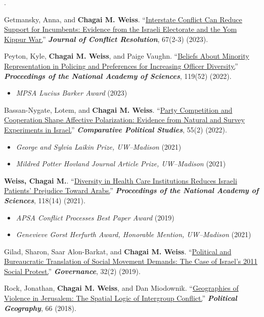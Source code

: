 \documentclass[11pt]{article}
\newcounter{cvpub}
\newenvironment{cvpubs}[1]
  {\setcounter{cvpub}{#1}\addtocounter{cvpub}{1}%
   \RaggedRight\interlinepenalty=150%
   \begin{list}{\addtocounter{cvpub}{-1}\arabic{cvpub}.}%
     {\setlength{\labelwidth}{1.85em}%
      \setlength{\labelsep}{0.45em}%
      \setlength{\leftmargin}{2.30em}%
      \setlength{\rightmargin}{0pt}%
      \setlength{\itemindent}{0pt}%
      \setlength{\listparindent}{0pt}%
      \setlength{\topsep}{0pt}%
      \setlength{\partopsep}{0pt}%
      \setlength{\parsep}{0pt}%
      \setlength{\itemsep}{5.5pt}%
      \renewcommand{\makelabel}[1]{\hfil##1}}}
  {\end{list}}
\newenvironment{cvnotes}[1][$\star$]
  {\begin{itemize}[#1,leftmargin=2.4em,labelsep=0.4em,
                   topsep=1.5pt,itemsep=0.5pt,parsep=0pt,partopsep=0pt]}
  {\end{itemize}}
\begin{document}
\begin{cvpubs}{18}
\item Getmansky, Anna, and \textbf{Chagai M. Weiss}. ``\href{https://journals.sagepub.com/doi/10.1177/00220027221114086}{Interstate Conflict Can Reduce Support for Incumbents: Evidence from the Israeli Electorate and the Yom Kippur War.}'' \textbf{\emph{Journal of Conflict Resolution}}, 67(2-3) (2023).
\item Peyton, Kyle, \textbf{Chagai M. Weiss}, and Paige Vaughn. ``\href{https://www.pnas.org/doi/10.1073/pnas.2213986119}{Beliefs About Minority Representation in Policing and Preferences for Increasing Officer Diversity.}'' \textbf{\emph{Proceedings of the National Academy of Sciences}}, 119(52) (2022).
\begin{cvnotes}
    \item \emph{MPSA Lucius Barker Award} (2023)
\end{cvnotes}
\item Bassan-Nygate, Lotem, and \textbf{Chagai M. Weiss}. ``\href{https://journals.sagepub.com/doi/full/10.1177/00104140211024283}{Party Competition and Cooperation Shape Affective Polarization: Evidence from Natural and Survey Experiments in Israel.}'' \textbf{\emph{Comparative Political Studies}}, 55(2) (2022).
\begin{cvnotes}
    \item \emph{George and Sylvia Laikin Prize, UW--Madison} (2021)
    \item \emph{Mildred Potter Hovland Journal Article Prize, UW--Madison} (2021)
\end{cvnotes}
\item \textbf{Weiss, Chagai M.}. ``\href{https://www.pnas.org/content/118/14/e2022634118}{Diversity in Health Care Institutions Reduces Israeli Patients' Prejudice Toward Arabs.}'' \textbf{\emph{Proceedings of the National Academy of Sciences}}, 118(14) (2021).
\begin{cvnotes}
    \item \emph{APSA Conflict Processes Best Paper Award} (2019)
    \item \emph{Genevieve Gorst Herfurth Award, Honorable Mention, UW--Madison} (2021)
\end{cvnotes}
\item Gilad, Sharon, Saar Alon-Barkat, and \textbf{Chagai M. Weiss}. ``\href{https://onlinelibrary.wiley.com/doi/abs/10.1111/gove.12383}{Political and Bureaucratic Translation of Social Movement Demands: The Case of Israel's 2011 Social Protest.}'' \textbf{\emph{Governance}}, 32(2) (2019).
\item Rock, Jonathan, \textbf{Chagai M. Weiss}, and Dan Miodownik. ``\href{https://www.sciencedirect.com/science/article/pii/S0962629817303323}{Geographies of Violence in Jerusalem: The Spatial Logic of Intergroup Conflict.}'' \textbf{\emph{Political Geography}}, 66 (2018).
\end{cvpubs}
\end{document}
